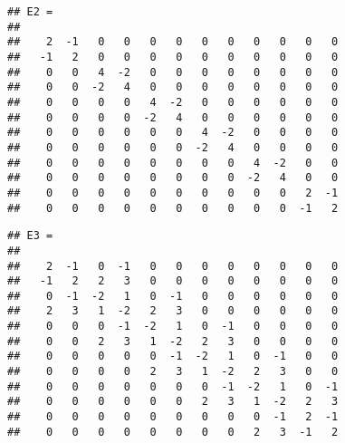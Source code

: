 \begin{samepage}
\begin{verbatim}
## E2 =
## 
##    2  -1   0   0   0   0   0   0   0   0   0   0
##   -1   2   0   0   0   0   0   0   0   0   0   0
##    0   0   4  -2   0   0   0   0   0   0   0   0
##    0   0  -2   4   0   0   0   0   0   0   0   0
##    0   0   0   0   4  -2   0   0   0   0   0   0
##    0   0   0   0  -2   4   0   0   0   0   0   0
##    0   0   0   0   0   0   4  -2   0   0   0   0
##    0   0   0   0   0   0  -2   4   0   0   0   0
##    0   0   0   0   0   0   0   0   4  -2   0   0
##    0   0   0   0   0   0   0   0  -2   4   0   0
##    0   0   0   0   0   0   0   0   0   0   2  -1
##    0   0   0   0   0   0   0   0   0   0  -1   2
\end{verbatim}          
\end{samepage}

\begin{samepage}
\begin{Shaded}
	\begin{Highlighting}[]

\NormalTok{v = [}\NormalTok{;-}\NormalTok{*}\NormalTok{(}\NormalTok{));}\NormalTok{];}
	
\NormalTok{(}
\NormalTok{(}\NormalTok{(}\NormalTok{(}\NormalTok{)),}
\NormalTok{(}\NormalTok{(}\NormalTok{(}\NormalTok{)),-}
	\end{Highlighting}
\end{Shaded}                                        
\end{samepage}
                    
\begin{samepage}
\begin{verbatim} 
## E3 =
## 
##    2  -1   0  -1   0   0   0   0   0   0   0   0
##   -1   2   2   3   0   0   0   0   0   0   0   0
##    0  -1  -2   1   0  -1   0   0   0   0   0   0
##    2   3   1  -2   2   3   0   0   0   0   0   0
##    0   0   0  -1  -2   1   0  -1   0   0   0   0
##    0   0   2   3   1  -2   2   3   0   0   0   0
##    0   0   0   0   0  -1  -2   1   0  -1   0   0
##    0   0   0   0   2   3   1  -2   2   3   0   0
##    0   0   0   0   0   0   0  -1  -2   1   0  -1
##    0   0   0   0   0   0   2   3   1  -2   2   3
##    0   0   0   0   0   0   0   0   0  -1   2  -1
##    0   0   0   0   0   0   0   0   2   3  -1   2
\end{verbatim}
\end{samepage}

